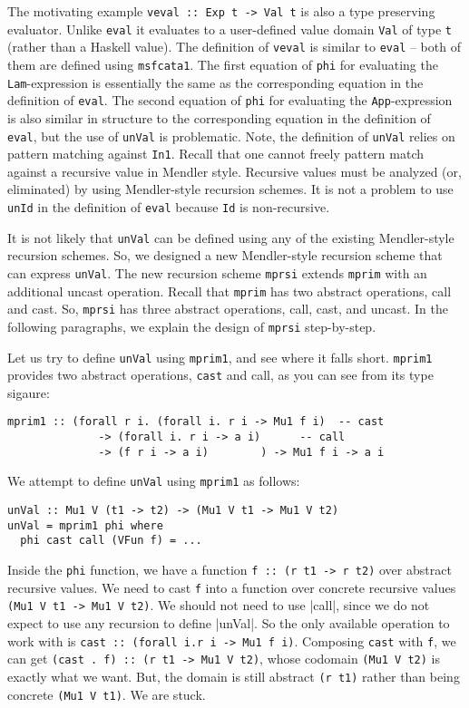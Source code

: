 The motivating example \lstinline{veval :: Exp t -> Val t} is also 
a type preserving evaluator. Unlike \lstinline{eval} it evaluates to 
a user-defined value domain \lstinline{Val} of type \lstinline{t} (rather
than a Haskell value). The definition of \lstinline{veval} is similar to
\lstinline{eval} -- both of them are defined using \lstinline{msfcata1}.
The first equation of \lstinline{phi} for evaluating
the \lstinline{Lam}-expression is essentially the same as
the corresponding equation in the definition of \lstinline{eval}.
The second equation of \lstinline{phi} for evaluating
the \lstinline{App}-expression is also similar in structure to
the corresponding equation in the definition of \lstinline{eval},
but the use of \lstinline{unVal} is problematic. Note, the definition of
\lstinline{unVal} relies on pattern matching against \lstinline{In1}.
Recall that one cannot freely pattern match against a recursive value
in Mendler style. Recursive values must be analyzed (or, eliminated) by
using Mendler-style recursion schemes. It is not a problem to use
\lstinline{unId} in the definition of \lstinline{eval} because
\lstinline{Id} is non-recursive.

It is not likely that \lstinline{unVal} can be defined using any of
the existing Mendler-style recursion schemes. So, we designed
a new Mendler-style recursion scheme that can express \lstinline{unVal}.
The new recursion scheme \lstinline{mprsi} extends \lstinline{mprim} with
an additional uncast operation. Recall that \lstinline{mprim} has
two abstract operations, call and cast. So, \lstinline{mprsi} has
three abstract operations, call, cast, and uncast. In the following paragraphs,
we explain the design of \lstinline{mprsi} step-by-step.

Let us try to define \lstinline{unVal} using \lstinline{mprim1}, and see
where it falls short. \lstinline{mprim1} provides two abstract operations,
\lstinline{cast} and {call}, as you can see from its type sigaure:
\begin{lstlisting}
mprim1 :: (forall r i. (forall i. r i -> Mu1 f i)  -- cast
              -> (forall i. r i -> a i)      -- call
              -> (f r i -> a i)        ) -> Mu1 f i -> a i
\end{lstlisting}
We attempt to define \lstinline{unVal} using \lstinline{mprim1} as follows:
\begin{lstlisting}
unVal :: Mu1 V (t1 -> t2) -> (Mu1 V t1 -> Mu1 V t2)
unVal = mprim1 phi where
  phi cast call (VFun f) = ...
\end{lstlisting}
Inside the \lstinline{phi} function, we have a function
\lstinline{f :: (r t1 -> r t2)} over abstract recursive values.
We need to cast \lstinline{f} into a function over concrete recursive values
\lstinline{(Mu1 V t1 -> Mu1 V t2)}.
We should not need to use |call|, since we do not expect
to use any recursion to define |unVal|.
So the only available operation to
work with is \lstinline{cast :: (forall i.r i -> Mu1 f i)}.
Composing \lstinline{cast} with \lstinline{f}, we can get
\lstinline{(cast . f) :: (r t1 -> Mu1 V t2)}, whose codomain
\lstinline{(Mu1 V t2)} is exactly what we want. But, the domain
is still abstract \lstinline{(r t1)} rather than being concrete
\lstinline{(Mu1 V t1)}. We are stuck.

